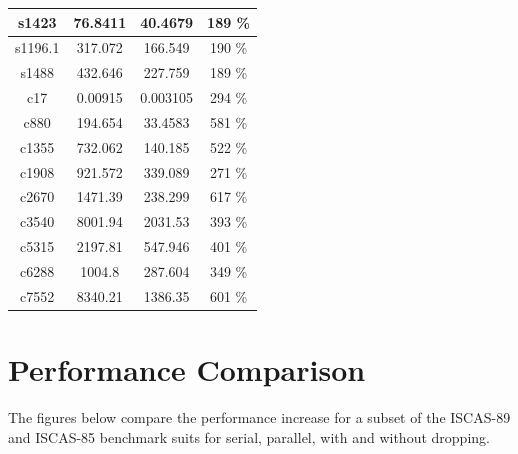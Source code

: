 \documentclass[a4paper,12pt]{article}
\begin{document}
\begin{center}
\begin{tabular}{||c c c c||}
\hline
s1423 & 76.8411 & 40.4679 & 189 \% \\ 
\hline
s1196.1 & 317.072 & 166.549 & 190 \% \\ 
\hline
s1488 & 432.646 & 227.759 & 189 \% \\ 
\hline
c17 & 0.00915 & 0.003105 & 294 \% \\ 
\hline
c880 & 194.654 & 33.4583 & 581 \% \\ 
\hline
c1355 & 732.062 & 140.185 & 522 \% \\ 
\hline
c1908 & 921.572 & 339.089 & 271 \% \\ 
\hline
c2670 & 1471.39 & 238.299 & 617 \% \\ 
\hline
c3540 & 8001.94 & 2031.53 & 393 \% \\ 
\hline
c5315 & 2197.81 & 547.946 & 401 \% \\ 
\hline
c6288 & 1004.8 & 287.604 & 349 \% \\ 
\hline
c7552 & 8340.21 & 1386.35 & 601 \% \\ 
\hline
\end{tabular}
\end{center}

\clearpage

\section*{Performance Comparison}
The figures below compare the performance increase for a subset of the ISCAS-89 and ISCAS-85 benchmark suits for serial, parallel, with and without dropping. 
\end{document}

